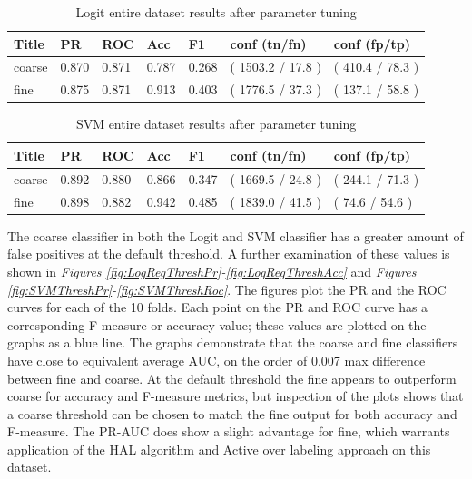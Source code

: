\documentclass[ms]{nuthesis}
\begin{document}
\FloatBarrier
\begin{table}[H]
\centering
\caption{Logit entire dataset results after parameter tuning}
\label{tab:LogRegAll-Wt23}
\begin{tabular}{|l||l||l||l||l||l||l|}\toprule
Title & PR & ROC & Acc & F1 & conf (tn/fn) & conf (fp/tp) \\ \midrule
coarse & 0.870 & 0.871 & 0.787 & 0.268 & ( 1503.2 / 17.8 ) & ( 410.4 / 78.3 ) \\
fine & 0.875 & 0.871 & 0.913 & 0.403 & ( 1776.5 / 37.3 ) & ( 137.1 / 58.8 ) \\ \bottomrule
\end{tabular}
\end{table}
\FloatBarrier


\FloatBarrier
\begin{table}[H]
\centering
\caption{SVM entire dataset results after parameter tuning}
\label{tab:SVM-All}
\begin{tabular}{|l||l||l||l||l||l||l|}\toprule
Title & PR & ROC & Acc & F1 & conf (tn/fn) & conf (fp/tp) \\ \midrule
coarse & 0.892 & 0.880 & 0.866 & 0.347 & ( 1669.5 / 24.8 ) & ( 244.1 / 71.3 ) \\
fine & 0.898 & 0.882 & 0.942 & 0.485 & ( 1839.0 / 41.5 ) & ( 74.6 / 54.6 ) \\ \bottomrule
\end{tabular}
\end{table}
\FloatBarrier

\par The coarse classifier in both the Logit and SVM classifier has a greater
 amount of false positives at the default threshold. A further examination of these
 values is shown in \textit{Figures \ref{fig:LogRegThreshPr}-\ref{fig:LogRegThreshAcc}}
  and \textit{Figures \ref{fig:SVMThreshPr}-\ref{fig:SVMThreshRoc}}. The figures plot the PR and the ROC
 curves for each of the 10 folds. Each point on the PR and ROC curve has a
 corresponding F-measure or accuracy value; these values are plotted on the graphs
 as a blue line. The graphs demonstrate that the coarse and fine classifiers have close
 to equivalent average AUC, on the order of 0.007 max difference between fine and coarse.
  At the default threshold the fine appears to outperform coarse for accuracy and F-measure
  metrics, but inspection of the plots shows that a coarse threshold can be chosen to match the fine output for
 both accuracy and F-measure. The PR-AUC does show a slight advantage for fine,
 which warrants application of the HAL algorithm and Active over labeling approach on this dataset.
\end{document}
